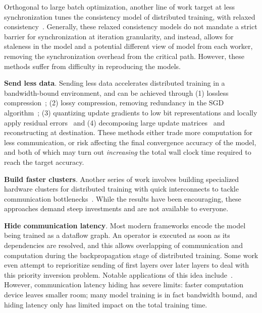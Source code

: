 Orthogonal to large batch optimization, another line of work target at less synchronization tunes the consistency model of distributed training, with relaxed consistency~\cite{DBLP:journals/corr/DaiKWHGX14,SSP,BSP,Wei:2015:MCC:2806777.2806778,Litz,xie2018orpheus,wang2018adaptive}. Generally, these relaxed consistency models do not mandate a strict barrier for synchronization at iteration granularity, and instead, allows for staleness in the model and a potential different view of model from each worker, removing the synchronization overhead from the critical path. However, these methods suffer from difficulty in reproducing the models. 

\noindent\textbf{Send less data}. Sending less data accelerates distributed training in a bandwidth-bound environment, and can be achieved through (1) lossless compression~\cite{burtscher2009fpc}; (2) lossy compression, removing redundancy in the SGD algorithm~\cite{lin2017deep}; (3) quantizing update gradients to low bit representations and locally apply residual errors~\cite{cntk1bt, lim20183lc} and (4) decomposing large update matrices~\cite{projectAdam,poseidon,xie2015distributed} and reconstructing at destination. These methods either trade more computation for less communication, or risk affecting the final convergence accuracy of the model, and both of which may turn out \textit{increasing} the total wall clock time required to reach the target accuracy.

\noindent\textbf{Build faster clusters}. Another series of work involves building specialized hardware clusters for distributed training with quick interconnects to tackle communication bottlenecks~\cite{DBLP:journals/corr/abs-1711-00489, You:2018:ITM:3225058.3225069, DBLP:journals/corr/abs-1711-04325,jia2018highly,DBLP:journals/corr/abs-1811-05233,sun2019optimizing, ImageNetIn1Hour, firecaffe}. While the results have been encouraging, these approaches demand steep investments and are not available to everyone.

\noindent\textbf{Hide communication latency}. Most modern frameworks encode the model being trained as a dataflow graph. An operator is executed as soon as its dependencies are resolved, and this allows overlapping of communication and computation during the backpropagation stage of distributed training. Some work even attempt to reprioritize sending of first layers over later layers to deal with this priority inversion problem. Notable applications of this idea include~\cite{hashemi2018tictac, prioritybased, poseidon, 10.1145/3341301.3359642}. However, communication latency hiding has severe limits: faster computation device leaves smaller room; many model training is in fact bandwidth bound, and hiding latency only has limited impact on the total training time.


